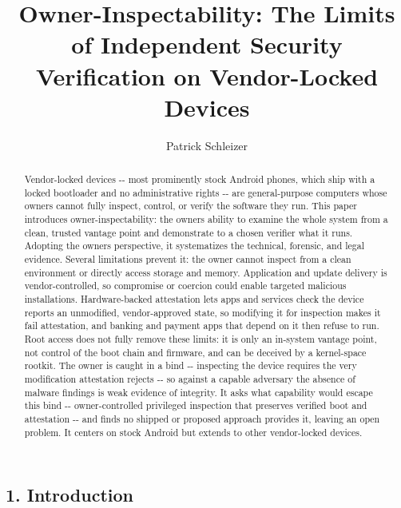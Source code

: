 \documentclass[
  manuscript,
  review,
  nonacm]{acmart}
\author{}
\date{}
\title{Owner-Inspectability: The Limits of Independent Security Verification on
Vendor-Locked Devices}
\author{Patrick Schleizer}
\begin{document}
\begin{abstract}
Vendor-locked devices -\/- most prominently stock Android phones, which
ship with a locked bootloader and no administrative rights -\/- are
general-purpose computers whose owners cannot fully inspect, control, or
verify the software they run. This paper introduces
owner-inspectability: the owner\textquotesingle s ability to examine the
whole system from a clean, trusted vantage point and demonstrate to a
chosen verifier what it runs. Adopting the owner\textquotesingle s
perspective, it systematizes the technical, forensic, and legal
evidence. Several limitations prevent it: the owner cannot inspect from
a clean environment or directly access storage and memory. Application
and update delivery is vendor-controlled, so compromise or coercion
could enable targeted malicious installations. Hardware-backed
attestation lets apps and services check the device reports an
unmodified, vendor-approved state, so modifying it for inspection makes
it fail attestation, and banking and payment apps that depend on it then
refuse to run. Root access does not fully remove these limits: it is
only an in-system vantage point, not control of the boot chain and
firmware, and can be deceived by a kernel-space rootkit. The owner is
caught in a bind -\/- inspecting the device requires the very
modification attestation rejects -\/- so against a capable adversary the
absence of malware findings is weak evidence of integrity. It asks what
capability would escape this bind -\/- owner-controlled privileged
inspection that preserves verified boot and attestation -\/- and finds
no shipped or proposed approach provides it, leaving an open problem. It
centers on stock Android but extends to other vendor-locked devices.
\end{abstract}
\maketitle

\subsection{1. Introduction}\label{introduction}
\end{document}

